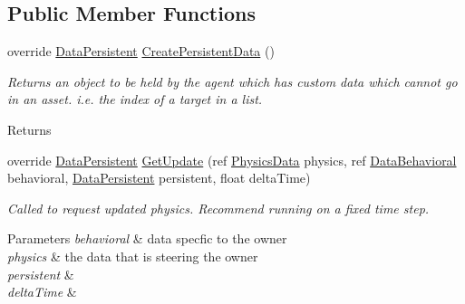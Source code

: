 \subsection*{Public Member Functions}
\begin{DoxyCompactItemize}
\item 
\hypertarget{class_skyrates_1_1_a_i_1_1_decorator_1_1_smooth_target_a8953e0395b1f115449335af08241e9e1}{override \hyperlink{class_skyrates_1_1_a_i_1_1_behavior_1_1_data_persistent}{Data\-Persistent} \hyperlink{class_skyrates_1_1_a_i_1_1_decorator_1_1_smooth_target_a8953e0395b1f115449335af08241e9e1}{Create\-Persistent\-Data} ()}\label{class_skyrates_1_1_a_i_1_1_decorator_1_1_smooth_target_a8953e0395b1f115449335af08241e9e1}

\begin{DoxyCompactList}\small\item\em Returns an object to be held by the agent which has custom data which cannot go in an asset. i.\-e. the index of a target in a list. 

\begin{DoxyReturn}{Returns}

\end{DoxyReturn}
 \end{DoxyCompactList}\item 
\hypertarget{class_skyrates_1_1_a_i_1_1_decorator_1_1_smooth_target_a38b2823d479254250b30bf46909f23d5}{override \hyperlink{class_skyrates_1_1_a_i_1_1_behavior_1_1_data_persistent}{Data\-Persistent} \hyperlink{class_skyrates_1_1_a_i_1_1_decorator_1_1_smooth_target_a38b2823d479254250b30bf46909f23d5}{Get\-Update} (ref \hyperlink{class_skyrates_1_1_physics_1_1_physics_data}{Physics\-Data} physics, ref \hyperlink{class_skyrates_1_1_a_i_1_1_behavior_1_1_data_behavioral}{Data\-Behavioral} behavioral, \hyperlink{class_skyrates_1_1_a_i_1_1_behavior_1_1_data_persistent}{Data\-Persistent} persistent, float delta\-Time)}\label{class_skyrates_1_1_a_i_1_1_decorator_1_1_smooth_target_a38b2823d479254250b30bf46909f23d5}

\begin{DoxyCompactList}\small\item\em Called to request updated physics. Recommend running on a fixed time step. 


\begin{DoxyParams}{Parameters}
{\em behavioral} & data specfic to the owner\\
\hline
{\em physics} & the data that is steering the owner\\
\hline
{\em persistent} & \\
\hline
{\em delta\-Time} & \\
\hline
\end{DoxyParams}
 \end{DoxyCompactList}\end{DoxyCompactItemize}

